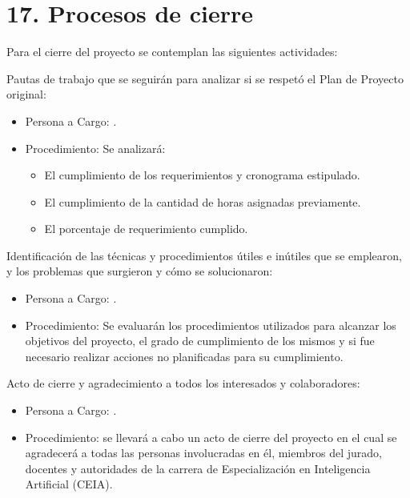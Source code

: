\documentclass[11pt]{charter}
\begin{document}
\begin{longtable}{|m{1cm}|m{3.5cm}|m{2.2cm}|m{2cm}|m{3cm}|m{1.5cm}|}
\end{longtable}


\section{17. Procesos de cierre}    
\label{sec:cierre}


Para el cierre del proyecto se contemplan las siguientes actividades:

Pautas de trabajo que se seguirán para analizar si se respetó el Plan de Proyecto original:
\begin{itemize}
\item Persona a Cargo: \authorname .
\item Procedimiento: Se analizará:
\begin{itemize}
\item El cumplimiento de los requerimientos y cronograma estipulado.
\item El cumplimiento de la cantidad de horas asignadas previamente.
\item El porcentaje de requerimiento cumplido.
\end{itemize}
\end{itemize}
Identificación de las técnicas y procedimientos útiles e inútiles que se emplearon, y los problemas que surgieron y cómo se solucionaron:
\begin{itemize}
\item Persona a Cargo: \authorname . 
\item Procedimiento: Se evaluarán los procedimientos utilizados para alcanzar los objetivos del proyecto, el grado de cumplimiento de los mismos y si fue necesario realizar acciones no planificadas para su cumplimiento.
\end{itemize}
Acto de cierre y agradecimiento a todos los interesados y colaboradores:
\begin{itemize}
\item Persona a Cargo: \authorname . 
\item Procedimiento: se llevará a cabo un acto de cierre del proyecto en el cual se agradecerá a todas las personas involucradas en él, miembros del jurado, docentes y autoridades de la carrera de Especialización en Inteligencia Artificial (CEIA).
\end{itemize}
\end{document}
